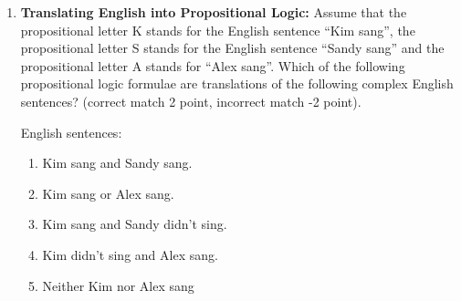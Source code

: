 \documentclass[a4,11pt]{article}
\newcommand{\6}{\mbox{$[\hspace*{-.6mm}[$}}
\newcommand{\9}{\mbox{$]\hspace*{-.6mm}]$}}
\begin{document}
\begin{enumerate}[leftmargin = 12pt]
{\bf Model answer:} The expression in (a) is true because the interpretation function I1 maps $u$ to 1, i.e., true. The expression in (b), on the other hand, is false because the interpretation function I2 maps $u$ to 0, i.e., false.

The expression in (c) is true because I1 maps both $u$ and $v$ to 1, and the complex expression $u \wedge v$ is true (1) according to the semantic rule for conjunction if and only if both of its arguments are true (which is the case here). The expression in (d) is false because I2 maps $u$ to false (0), and so it is not the case that both conjuncts are true.

The expression in (e) is true: I1 maps $w$ to 0, but the semantic rule for negation states that a complex negated expression is true if and only if the not-negated expression is false. Because $w$ is false under I1, its negation is true under I1. The expression in (f) is false: I2 maps $w$ to 1 (true), and so the negation of $w$ under I2 is false.

The expression in (g) is true: we already determined that the expression $u \wedge v$ is true under I2, and the semantic rule for disjunction states that the complex expression with disjunction is true if and only if at least one of the disjuncts is true. It doesn't matter that $w$ is false under I1 because the first disjunct is true. The expression in (h) is also true: even though the left disjunct is false (as we determined above) under I2, the right disjunct (i.e., $w$) is true under I2, which means that at least one disjunct is true, rendering the entire expression true.


\item {\bf Translating English into Propositional Logic:} Assume that the propositional letter K stands for the English sentence ``Kim sang'', the propositional letter S stands for the English sentence ``Sandy sang'' and the propositional letter A stands for ``Alex sang''. Which of the following propositional logic formulae are translations of the following complex English sentences? (correct match 2 point, incorrect match -2 point).

English sentences:

\begin{enumerate}[noitemsep]
\item Kim sang and Sandy sang. 
\item Kim sang or Alex sang.
\item Kim sang and Sandy didn't sing.
\item Kim didn't sing and Alex sang.
\item Neither Kim nor Alex sang
\end{enumerate}


\end{enumerate}
\end{document}
